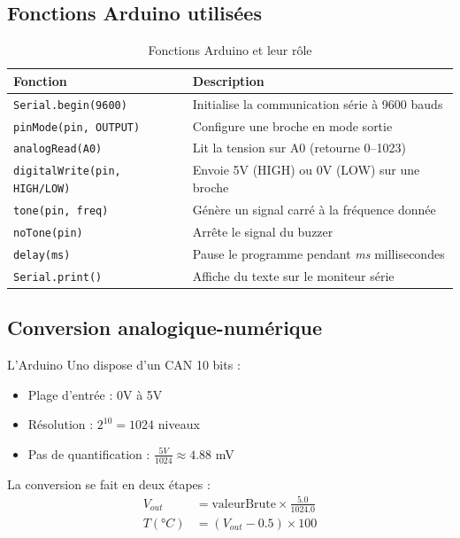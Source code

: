 \documentclass[12pt, a4paper]{article}
\begin{document}
\subsection{Fonctions Arduino utilisées}

\begin{table}[H]
    \centering
    \caption{Fonctions Arduino et leur rôle}
    \begin{tabular}{lp{9cm}}
        \toprule
        \textbf{Fonction} & \textbf{Description} \\
        \midrule
        \texttt{Serial.begin(9600)} & Initialise la communication série à 9600 bauds \\
        \texttt{pinMode(pin, OUTPUT)} & Configure une broche en mode sortie \\
        \texttt{analogRead(A0)} & Lit la tension sur A0 (retourne 0--1023) \\
        \texttt{digitalWrite(pin, HIGH/LOW)} & Envoie 5V (HIGH) ou 0V (LOW) sur une broche \\
        \texttt{tone(pin, freq)} & Génère un signal carré à la fréquence donnée \\
        \texttt{noTone(pin)} & Arrête le signal du buzzer \\
        \texttt{delay(ms)} & Pause le programme pendant \textit{ms} millisecondes \\
        \texttt{Serial.print()} & Affiche du texte sur le moniteur série \\
        \bottomrule
    \end{tabular}
\end{table}

\subsection{Conversion analogique-numérique}

L'Arduino Uno dispose d'un CAN 10 bits :
\begin{itemize}
    \item Plage d'entrée : 0V à 5V
    \item Résolution : $2^{10} = 1024$ niveaux
    \item Pas de quantification : $\frac{5V}{1024} \approx 4.88$ mV
\end{itemize}

La conversion se fait en deux étapes :
\begin{align}
    V_{out} &= \text{valeurBrute} \times \frac{5.0}{1024.0} \\
    T(°C) &= (V_{out} - 0.5) \times 100
\end{align}
\end{document}
